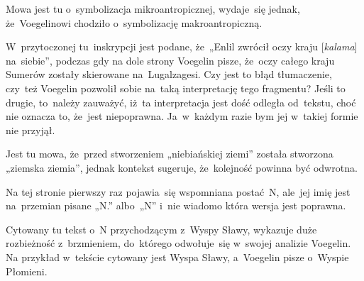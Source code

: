 \documentclass[a4paper,11pt]{article}
\begin{document}
\newpage





\start {} Mowa jest tu o~symbolizacja mikroantropicznej,
wydaje~się jednak, że~Voegelinowi chodziło o~symbolizację
makroantropiczną.

\vspace{\spaceFour}





\start {} W~przytoczonej tu~inskrypcji jest podane, że~„Enlil
zwrócił oczy kraju [\textit{kalama}] na~siebie”, podczas gdy na dole
strony Voegelin pisze, że~oczy całego kraju Sumerów zostały skierowane
na~Lugalzagesi. Czy jest to błąd tłumaczenie, czy~też Voegelin
pozwolił sobie na~taką interpretację tego fragmentu? Jeśli to drugie,
to~należy zauważyć, iż~ta interpretacja jest dość odległa od~tekstu,
choć nie oznacza to, że~jest niepoprawna. Ja~w~każdym razie bym jej
w~takiej formie nie przyjął.

\vspace{\spaceFour}





\start {} Jest tu mowa, że~przed stworzeniem „niebiańskiej
ziemi” została stworzona „ziemska ziemia”, jednak kontekst
sugeruje, że~kolejność powinna być odwrotna.

\vspace{\spaceFour}





\start {} Na tej stronie pierwszy raz pojawia~się wspomniana
postać~N, ale~jej imię jest na~przemian pisane „N.” albo~„N” i~nie
wiadomo która wersja jest poprawna.

\vspace{\spaceFour}





\start {} Cytowany tu tekst o~N przychodzącym z~Wyspy Sławy,
wykazuje duże rozbieżność z~brzmieniem, do~którego odwołuje~się
w~swojej analizie Voegelin. Na przykład w~tekście cytowany jest Wyspa
Sławy, a~Voegelin pisze o~Wyspie Płomieni.

\vspace{\spaceFour}
\end{document}
